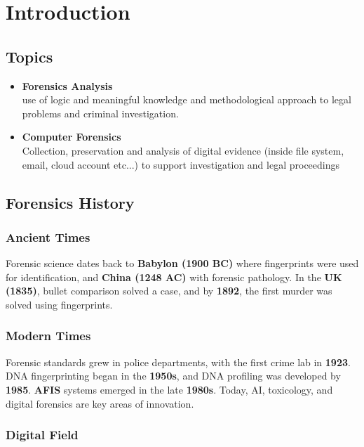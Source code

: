 \chapter{Introduction}

\section{Topics}
\begin{itemize}
    \item \textbf{Forensics Analysis} \\
        use of logic and meaningful knowledge and methodological approach to 
        legal problems and criminal investigation.
    \item \textbf{Computer Forensics} \\
        Collection, preservation and analysis of digital evidence 
        (inside file system, email, cloud account etc...) to support 
        investigation and legal proceedings
\end{itemize}

\section{Forensics History}

\subsection{Ancient Times}
Forensic science dates back to \textbf{Babylon (1900 BC)} where fingerprints 
were used for identification, and \textbf{China (1248 AC)} with forensic pathology.
 In the \textbf{UK (1835)}, bullet comparison solved a case, and by \textbf{1892}, 
 the first murder was solved using fingerprints.

\subsection{Modern Times}
Forensic standards grew in police departments, with the first crime lab in 
\textbf{1923}. DNA fingerprinting began in the \textbf{1950s}, and DNA profiling
 was developed by \textbf{1985}. \textbf{AFIS} systems emerged in the late 
 \textbf{1980s}. Today, AI, toxicology, and digital forensics are key areas 
 of innovation.

\subsection{Digital Field}

